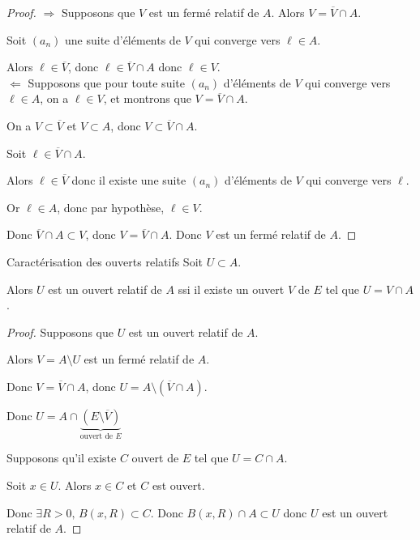     
\begin{proof}
    $\Rightarrow$ Supposons que $V$ est un fermé relatif de $A$. 
    Alors $V = \overline V \cap A$. 

    Soit $(a_n)$ une suite d'éléments de $V$ qui converge vers $\ell \in A$.

    Alors $\ell \in \overline V$, donc $\ell \in \overline V \cap A$ donc $\ell \in V$. \\

    $\Leftarrow$ Supposons que pour toute suite $(a_n)$ d'éléments de $V$ qui converge vers
    $\ell \in A$, on a $\ell \in V$, et montrons que $V = \overline V \cap A$. 

    On a $V \subset \overline V$ et $V \subset A$, donc $V \subset \overline V \cap A$.

    Soit $\ell \in \overline V \cap A$.

    Alors $\ell \in \overline V$ donc il existe une suite $(a_n)$ d'éléments de $V$ qui converge vers $\ell$.

    Or $\ell \in A$, donc par hypothèse, $\ell \in V$.

    Donc $\overline V \cap A \subset V$, donc $V = \overline V \cap A$.
    Donc $V$ est un fermé relatif de $A$.
\end{proof}

\begin{proposition}{Caractérisation des ouverts relatifs}{}
    Soit $U \subset A$. 

    Alors $U$ est un ouvert relatif de $A$ ssi il existe un ouvert $V$ de $E$ tel que 
    $U = V \cap A$.
\end{proposition}

\begin{proof}
    Supposons que $U$ est un ouvert relatif de $A$.

    Alors $V = A \setminus U$ est un fermé relatif de $A$.

    Donc $V = \overline V \cap A$, donc $U = A \setminus (\overline V \cap A)$. 

    Donc $U = A \cap \underbrace{(E \setminus \overline V)}_{\text{ouvert de } E}$

    \avspace Supposons qu'il existe $C$ ouvert de $E$ tel que $U = C \cap A$.

    Soit $x \in U$. Alors $x \in C$ et $C$ est ouvert.

    Donc $\exists R > 0, \, B(x, R) \subset C$.
    Donc $B(x, R) \cap A \subset U$ donc $U$ est un ouvert relatif de $A$.
\end{proof}

